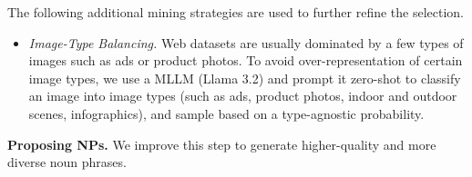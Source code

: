 \documentclass[]{fairmeta}
\renewcommand{\paragraph}[1]{%
	\noindent\textbf{#1.}\noindent\xspace%
}
\begin{document}
The following additional mining strategies are used to further refine the selection.
\begin{itemize}
	
	\item \textit{Image-Type Balancing.} Web datasets are usually dominated by a few types of images such as ads or product photos. To avoid over-representation of certain image types, we use a MLLM (Llama 3.2) and prompt it zero-shot to classify an image into image types (such as ads, product photos, indoor and outdoor scenes, infographics), and sample based on a type-agnostic probability.
\end{itemize}

\paragraph{Proposing NPs} We improve this step to generate higher-quality and more diverse noun phrases.
\end{document}
